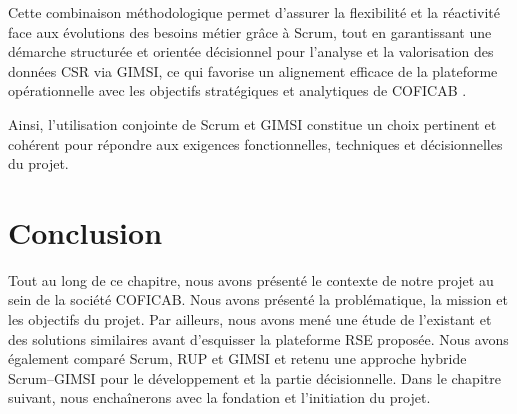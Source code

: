 Cette combinaison méthodologique permet d’assurer la flexibilité et la réactivité face aux évolutions des besoins métier grâce à Scrum, tout en garantissant une démarche structurée et orientée décisionnel pour l’analyse et la valorisation des données CSR via GIMSI, ce qui favorise un alignement efficace de la plateforme opérationnelle avec les objectifs stratégiques et analytiques de COFICAB .

Ainsi, l’utilisation conjointe de Scrum et GIMSI constitue un choix pertinent et cohérent pour répondre aux exigences fonctionnelles, techniques et décisionnelles du projet.

\section{Conclusion}

Tout au long de ce chapitre, nous avons présenté le contexte de notre projet au sein  de la société COFICAB. Nous avons présenté la problématique, la mission et les objectifs du projet. Par ailleurs, nous avons mené une étude de l’existant et des solutions similaires avant d’esquisser la plateforme RSE proposée. Nous avons également comparé Scrum, RUP et GIMSI et retenu une approche hybride Scrum–GIMSI pour le développement et la partie décisionnelle. Dans le chapitre suivant, nous enchaînerons avec la fondation et l’initiation du projet.